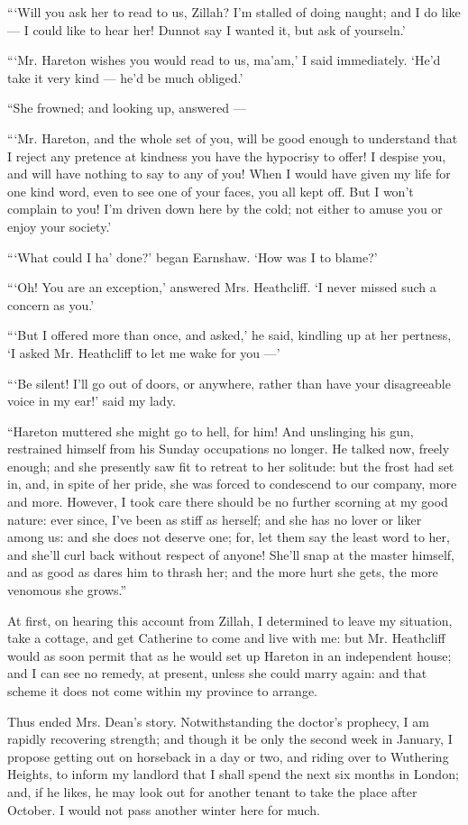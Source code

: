 \par “‘Will you ask her to read to us, Zillah? I'm stalled of doing naught; and I do like — I could like to hear her! Dunnot say I wanted it, but ask of yourseln.’
\par “‘Mr. Hareton wishes you would read to us, ma'am,’ I said immediately. ‘He'd take it very kind — he'd be much obliged.’
\par “She frowned; and looking up, answered —
\par “‘Mr. Hareton, and the whole set of you, will be good enough to understand that I reject any pretence at kindness you have the hypocrisy to offer! I despise you, and will have nothing to say to any of you! When I would have given my life for one kind word, even to see one of your faces, you all kept off. But I won't complain to you! I'm driven down here by the cold; not either to amuse you or enjoy your society.’
\par “‘What could I ha' done?’ began Earnshaw. ‘How was I to blame?’
\par “‘Oh! You are an exception,’ answered Mrs. Heathcliff. ‘I never missed such a concern as you.’
\par “‘But I offered more than once, and asked,’ he said, kindling up at her pertness, ‘I asked Mr. Heathcliff to let me wake for you —’
\par “‘Be silent! I'll go out of doors, or anywhere, rather than have your disagreeable voice in my ear!’ said my lady.
\par “Hareton muttered she might go to hell, for him! And unslinging his gun, restrained himself from his Sunday occupations no longer. He talked now, freely enough; and she presently saw fit to retreat to her solitude: but the frost had set in, and, in spite of her pride, she was forced to condescend to our company, more and more. However, I took care there should be no further scorning at my good nature: ever since, I've been as stiff as herself; and she has no lover or liker among us: and she does not deserve one; for, let them say the least word to her, and she'll curl back without respect of anyone! She'll snap at the master himself, and as good as dares him to thrash her; and the more hurt she gets, the more venomous she grows.”
\par At first, on hearing this account from Zillah, I determined to leave my situation, take a cottage, and get Catherine to come and live with me: but Mr. Heathcliff would as soon permit that as he would set up Hareton in an independent house; and I can see no remedy, at present, unless she could marry again: and that scheme it does not come within my province to arrange.
\par 
\par Thus ended Mrs. Dean's story. Notwithstanding the doctor's prophecy, I am rapidly recovering strength; and though it be only the second week in January, I propose getting out on horseback in a day or two, and riding over to Wuthering Heights, to inform my landlord that I shall spend the next six months in London; and, if he likes, he may look out for another tenant to take the place after October. I would not pass another winter here for much.

